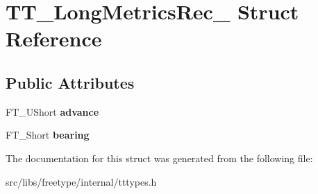 \hypertarget{struct_t_t___long_metrics_rec__}{
\section{TT\_\-LongMetricsRec\_\- Struct Reference}
\label{struct_t_t___long_metrics_rec__}
}
\subsection*{Public Attributes}
\begin{DoxyCompactItemize}
\item 
\hypertarget{struct_t_t___long_metrics_rec___a47100e42b52486bc374f80ed2795361d}{
FT\_\-UShort {\bfseries advance}}
\label{struct_t_t___long_metrics_rec___a47100e42b52486bc374f80ed2795361d}

\item 
\hypertarget{struct_t_t___long_metrics_rec___a0d74e3eb8611b0a5e89e338af35be4da}{
FT\_\-Short {\bfseries bearing}}
\label{struct_t_t___long_metrics_rec___a0d74e3eb8611b0a5e89e338af35be4da}

\end{DoxyCompactItemize}


The documentation for this struct was generated from the following file:\begin{DoxyCompactItemize}
\item 
src/libs/freetype/internal/tttypes.h\end{DoxyCompactItemize}
